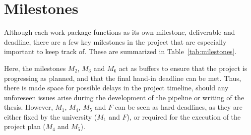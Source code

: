 \section{Milestones}
Although each work package functions as its own milestone, deliverable and deadline, there are a few key milestones in the project that are especially important to keep track of.
These are summarized in Table~\ref{tab:milestones}.

\begin{table}[h]
\caption{Milestones. D: Deadline, B: Buffer, TH: Thesis}
\label{tab:milestones}
\end{table}

Here, the milestones $M_2$, $M_3$ and $M_6$ act as buffers to ensure that the project is progressing as planned, and that the final hand-in deadline can be met.
Thus, there is made space for possible delays in the project timeline, should any unforeseen issues arise during the development of the pipeline or writing of the thesis.
However, $M_1$, $M_4$, $M_5$ and $F$ can be seen as hard deadlines, as they are either fixed by the university ($M_1$ and $F$), or required for the execution of the project plan ($M_4$ and $M_5$).

